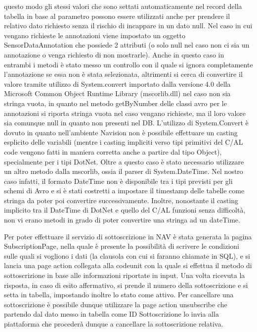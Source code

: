 questo modo gli stessi valori che sono settati automaticamente nel record della tabella in base al parametro possono essere utilizzati anche per prendere il relativo dato richiesto senza il rischio di incappare in un dato null. Nel caso in cui vengano richieste le annotazioni viene impostato un oggetto SensorDataAnnotation che possiede 2 attributi (o solo null nel caso non ci sia un annotazione o venga richiesto di non mostrarle). Anche in questo caso in entrambi i metodi è stato messo un controllo con il quale si ignora completamente l’annotazione se essa non è stata selezionata, altrimenti si cerca di convertire il valore tramite utilizzo di System.convert importato dalla versione 4.0 della Microsoft Common Object Runtime Library (mscorlib.dll) nel caso non sia stringa vuota, in quanto nel metodo getByNumber delle classi avro per le annotazioni si riporta stringa vuota nel caso vengano richieste, ma il loro valore sia comunque null in quanto non presenti nel DB. L’utilizzo di System.Convert è dovuto in quanto nell’ambiente Navision non è possibile effettuare un casting esplicito delle variabili (mentre i casting impliciti verso tipi primitivi del C/AL code vengono fatti in maniera corretta anche a partire dal tipo Object), specialmente per i tipi DotNet. Oltre a questo caso è stato necessario utilizzare un altro metodo dalla mscorlib, ossia il parser di System.DateTime. Nel nostro caso infatti, il formato DateTime non è disponibile tra i tipi previsti per gli schemi di Avro e si è stati costretti a impostare il timestamp delle tabelle come stringa da poter poi convertire successivamente. Inoltre, nonostante il casting implicito tra il DateTime di DotNet e quello del C/AL funzioni senza difficoltà, non vi erano metodi in grado di poter convertire una stringa ad un dateTime.

Per poter effettuare il servizio di sottoscrizione in NAV è stata generata la pagina SubscriptionPage, nella quale è presente la possibilità di scrivere le condizioni sulle quali si vogliono i dati (la clausola con cui si faranno chiamate in SQL), e si lancia una page action collegata alla codeunit con la quale si effettua il metodo di sottoscrizione in base alle informazioni riportate in input. Una volta ricevuta la risposta, in caso di esito affermativo, si prende il numero della sottoscrizione e si setta in tabella, impostando inoltre lo stato come attivo. Per cancellare una sottoscrizione è possibile dunque utilizzare la page action unsubscribe che partendo dal dato messo in tabella come ID Sottoscrizione lo invia alla piattaforma che procederà dunque a cancellare la sottoscrizione relativa. 

